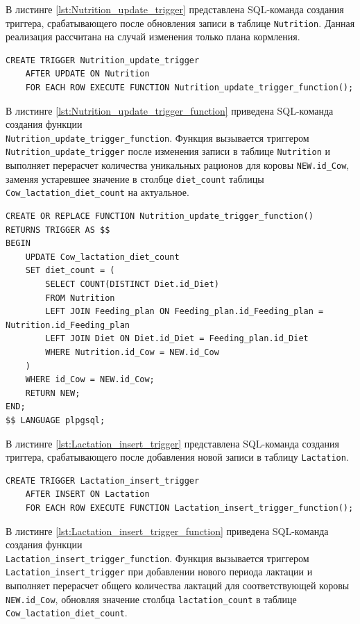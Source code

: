В листинге \ref{lst:Nutrition_update_trigger} представлена SQL-команда создания триггера,
срабатывающего после обновления записи в таблице \texttt{Nutrition}.
Данная реализация рассчитана на случай изменения только плана кормления.

\begin{lstlisting}[caption={Создание триггера Nutrition\_update\_trigger}, label={lst:Nutrition_update_trigger}]
CREATE TRIGGER Nutrition_update_trigger
    AFTER UPDATE ON Nutrition 
    FOR EACH ROW EXECUTE FUNCTION Nutrition_update_trigger_function();
\end{lstlisting}

В листинге \ref{lst:Nutrition_update_trigger_function} приведена SQL-команда создания функции
\\\texttt{Nutrition\_update\_trigger\_function}.
Функция вызывается триггером \texttt{Nutrition\_update\_trigger} после изменения записи
в таблице \texttt{Nutrition} и выполняет перерасчет количества уникальных рационов для коровы
\texttt{NEW.id\_Cow}, заменяя устаревшее значение в столбце \texttt{diet\_count}
таблицы \texttt{Cow\_lactation\_diet\_count} на актуальное.

\begin{lstlisting}[caption={Создание функции Nutrition\_update\_trigger\_function}, label={lst:Nutrition_update_trigger_function}]
CREATE OR REPLACE FUNCTION Nutrition_update_trigger_function()
RETURNS TRIGGER AS $$
BEGIN
    UPDATE Cow_lactation_diet_count 
    SET diet_count = (
        SELECT COUNT(DISTINCT Diet.id_Diet)
        FROM Nutrition
        LEFT JOIN Feeding_plan ON Feeding_plan.id_Feeding_plan = Nutrition.id_Feeding_plan
        LEFT JOIN Diet ON Diet.id_Diet = Feeding_plan.id_Diet
        WHERE Nutrition.id_Cow = NEW.id_Cow
    )
    WHERE id_Cow = NEW.id_Cow;
    RETURN NEW; 
END;
$$ LANGUAGE plpgsql;
\end{lstlisting}

В листинге \ref{lst:Lactation_insert_trigger} представлена SQL-команда создания триггера,
срабатывающего после добавления новой записи в таблицу \texttt{Lactation}.

\begin{lstlisting}[caption={Создание триггера Lactation\_insert\_trigger}, label={lst:Lactation_insert_trigger}]
CREATE TRIGGER Lactation_insert_trigger
    AFTER INSERT ON Lactation 
    FOR EACH ROW EXECUTE FUNCTION Lactation_insert_trigger_function();
\end{lstlisting}

В листинге \ref{lst:Lactation_insert_trigger_function} приведена SQL-команда создания функции
\\\texttt{Lactation\_insert\_trigger\_function}.
Функция вызывается триггером \texttt{Lactation\_insert\_trigger} при добавлении нового периода лактации
и выполняет перерасчет общего количества лактаций для соответствующей коровы \texttt{NEW.id\_Cow},
обновляя значение столбца \texttt{lactation\_count} в таблице \texttt{Cow\_lactation\_diet\_count}.

